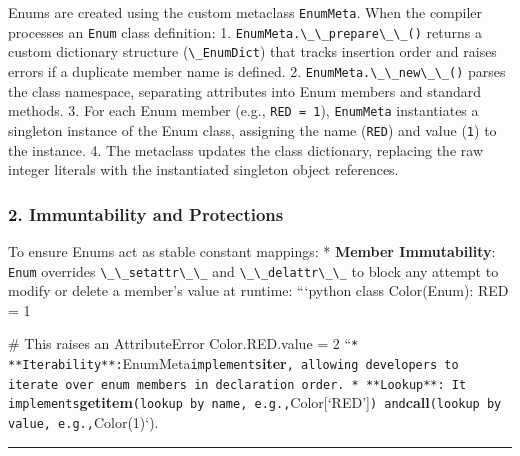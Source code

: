 Enums are created using the custom metaclass
\passthrough{\lstinline!EnumMeta!}. When the compiler processes an
\passthrough{\lstinline!Enum!} class definition: 1.
\passthrough{\lstinline!EnumMeta.\_\_prepare\_\_()!} returns a custom
dictionary structure (\passthrough{\lstinline!\_EnumDict!}) that tracks
insertion order and raises errors if a duplicate member name is defined.
2. \passthrough{\lstinline!EnumMeta.\_\_new\_\_()!} parses the class
namespace, separating attributes into Enum members and standard methods.
3. For each Enum member (e.g., \passthrough{\lstinline!RED = 1!}),
\passthrough{\lstinline!EnumMeta!} instantiates a singleton instance of
the Enum class, assigning the name (\passthrough{\lstinline!RED!}) and
value (\passthrough{\lstinline!1!}) to the instance. 4. The metaclass
updates the class dictionary, replacing the raw integer literals with
the instantiated singleton object references.

\hypertarget{immuntability-and-protections}{%
\subsubsection{2. Immuntability and
Protections}\label{immuntability-and-protections}}

To ensure Enums act as stable constant mappings: * \textbf{Member
Immutability}: \passthrough{\lstinline!Enum!} overrides
\passthrough{\lstinline!\_\_setattr\_\_!} and
\passthrough{\lstinline!\_\_delattr\_\_!} to block any attempt to modify
or delete a member's value at runtime: ```python class Color(Enum): RED
= 1

\# This raises an AttributeError Color.RED.value = 2
``\passthrough{\lstinline!* **Iterability**:!}EnumMeta\passthrough{\lstinline!implements!}\textbf{iter}\passthrough{\lstinline!, allowing developers to iterate over enum members in declaration order. * **Lookup**: It implements!}\textbf{getitem}\passthrough{\lstinline!(lookup by name, e.g.,!}Color{[}`RED'{]}\passthrough{\lstinline!) and!}\textbf{call}\passthrough{\lstinline!(lookup by value, e.g.,!}Color(1)`).

\begin{center}\rule{0.5\linewidth}{0.5pt}\end{center}
